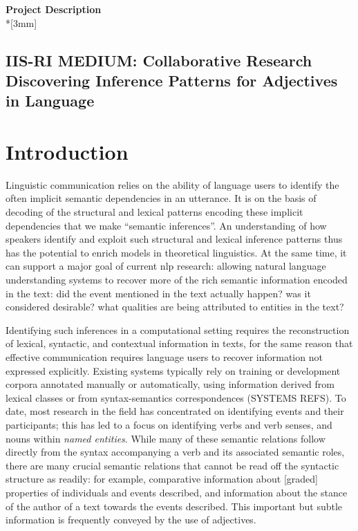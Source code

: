 \documentclass[10pt]{article}
\begin{document}
\begin{center}
{\LARGE{\bf Project Description}}\\*[3mm]
\vspace {-6mm}
 
\subsection*{IIS-RI MEDIUM: Collaborative Research\\
Discovering Inference Patterns for Adjectives in Language}
\end{center}

\vspace {-2mm}

\section{\label{intro}Introduction}


\vspace {-3mm}

Linguistic communication relies on the ability of language users to identify the often implicit semantic dependencies in an utterance. 
It is on the basis of decoding of the structural and lexical patterns encoding these implicit dependencies that we make ``semantic inferences''.
An understanding of how speakers identify and exploit such structural and lexical inference patterns thus has the potential to enrich models in theoretical linguistics. 
At the same time, it can support a major goal of current {\sc nlp} research: allowing natural language understanding systems to recover more of the rich semantic information encoded in the text: did the event mentioned in the text actually happen? was it considered desirable?
what qualities are being attributed to entities in the text?

Identifying such inferences in a computational setting requires the reconstruction of lexical, syntactic, and contextual information in texts, for the same reason that effective communication requires language users to recover information not expressed explicitly. Existing systems typically rely on training or development corpora annotated manually or automatically, using information derived from lexical classes or from syntax-semantics correspondences (SYSTEMS REFS). 
To date, most research in the field has concentrated on identifying events and their participants; this has led to a focus on identifying verbs and verb senses, and nouns within {\it named entities}. While many of these semantic relations follow directly from the syntax accompanying a verb and its associated semantic roles, there are many crucial semantic relations that cannot be read off the syntactic structure as readily: for example, comparative information about [graded] properties of individuals and events described, and information about the stance of the author of a text towards the events described. This important but subtle information is frequently conveyed by the use of adjectives.
\end{document}
